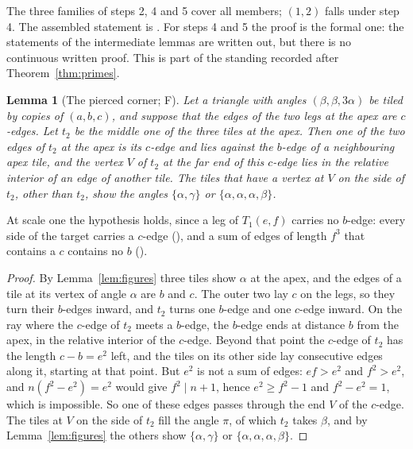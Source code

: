 \documentclass[11pt,reqno]{amsart}
\theoremstyle{plain}
\newtheorem{lemma}[theorem]{Lemma}
\theoremstyle{definition}
\newcommand{\sF}{\textup{\textsf{F}}}
\begin{document}
The three families of steps 2, 4 and 5 cover all members; $(1,2)$ falls under step 4. The assembled
statement is . For steps 4 and 5 the proof is the formal one: the
statements of the intermediate lemmas are written out, but there is no continuous written proof. This is part
of the standing recorded after Theorem~\ref{thm:primes}.

\begin{lemma}[The pierced corner; \sF]\label{lem:pierce}
Let a triangle with angles $(\beta,\beta,3\alpha)$ be tiled by copies of $(a,b,c)$, and suppose that the
edges of the two legs at the apex are $c$-edges. Let $t_2$ be the middle one of the three tiles at the apex.
Then one of the two edges of $t_2$ at the apex is its $c$-edge and lies against the $b$-edge of a
neighbouring apex tile, and the vertex $V$ of $t_2$ at the far end of this $c$-edge lies in the relative
interior of an edge of another tile. The tiles that have a vertex at $V$ on the side of $t_2$, other than
$t_2$, show the angles $\{\alpha,\gamma\}$ or $\{\alpha,\alpha,\alpha,\beta\}$.
\end{lemma}

At scale one the hypothesis holds, since a leg of $T_1(e,f)$ carries no $b$-edge: every side of the target
carries a $c$-edge (), and a sum of edges of length $f^3$ that
contains a $c$ contains no $b$ ().

\begin{proof}
By Lemma~\ref{lem:figures} three tiles show $\alpha$ at the apex, and the edges of a tile at its vertex of
angle $\alpha$ are $b$ and $c$. The outer two lay $c$ on the legs, so they turn their $b$-edges inward, and
$t_2$ turns one $b$-edge and one $c$-edge inward. On the ray where the $c$-edge of $t_2$ meets a $b$-edge,
the $b$-edge ends at distance $b$ from the apex, in the relative interior of the $c$-edge. Beyond that point
the $c$-edge of $t_2$ has the length $c-b=e^2$ left, and the tiles on its other side lay consecutive edges
along it, starting at that point. But $e^2$ is not a sum of edges: $ef>e^2$ and $f^2>e^2$, and
$n(f^2-e^2)=e^2$ would give $f^2\mid n+1$, hence $e^2\ge f^2-1$ and $f^2-e^2=1$, which is impossible. So one
of these edges passes through the end $V$ of the $c$-edge. The tiles at $V$ on the side of $t_2$ fill the angle $\pi$, of which $t_2$ takes $\beta$, and by
Lemma~\ref{lem:figures} the others show $\{\alpha,\gamma\}$ or $\{\alpha,\alpha,\alpha,\beta\}$.
\end{proof}
\end{document}
